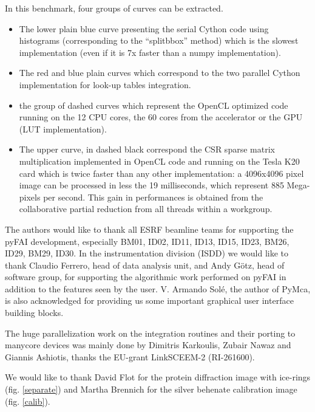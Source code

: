 \documentclass[preprint]{iucr}
\begin{document}
In this benchmark, four groups of curves can be extracted.
\begin{itemize}
  \item The lower plain blue curve presenting the serial Cython code using
  histograms (corresponding to the ``splitbbox'' method) which is the slowest
  implementation (even if it is 7x faster than a numpy implementation).
  \item The red and blue plain curves which correspond to the two parallel
  Cython implementation for look-up tables integration.
  \item the group of dashed curves which represent the OpenCL optimized code
  running on the 12 CPU cores, the 60 cores from the accelerator or the GPU (LUT
  implementation).
  \item The upper curve, in dashed black correspond the CSR sparse matrix
  multiplication implemented in OpenCL code and running on the Tesla K20 card
  which is twice faster than any other implementation: a 4096x4096 pixel image
  can be processed in less the 19 milliseconds, which represent 885 Mega-pixels
  per second. This gain in performances is obtained from the collaborative
  partial reduction from all threads within a workgroup.
\end{itemize}



The authors would like to thank all ESRF beamline teams for supporting the
pyFAI development, especially BM01, ID02, ID11, ID13, ID15, ID23, BM26, ID29, BM29,
ID30. In the instrumentation division (ISDD) we would like to thank Claudio
Ferrero, head of data analysis unit, and Andy G\"otz, head of software group, for
supporting the algorithmic work performed on pyFAI in addition to the features
seen by the user.
V. Armando Solé, the author of PyMca, is also acknowledged for providing us some
important graphical user interface building blocks.

The huge parallelization work on the integration routines and their porting to
manycore devices was mainly done by Dimitris Karkoulis, Zubair Nawaz and Giannis Ashiotis,
thanks the EU-grant LinkSCEEM-2 (RI-261600).

We would like to thank David Flot for the protein
diffraction image with ice-rings (fig. \ref{separate}) and Martha Brennich for
the silver behenate calibration image (fig. \ref{calib}).
\end{document}
